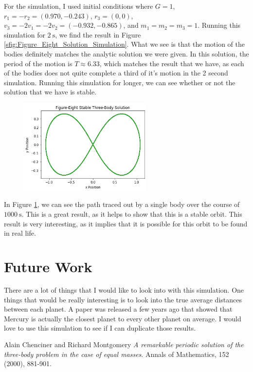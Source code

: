 \documentclass{article}
\renewcommand{\l}{\left}
\renewcommand{\r}{\right}
\begin{document}
For the simulation, I used initial conditions where $G = 1$, $r_1 = -r_2 = \l( 0.970 , -0.243 \r)$, $r_3 = (0,0)$, $v_3 = -2v_1 = -2v_2 = \l(-0.932, -0.865\r)$, and $m_1 = m_2 = m_3 = 1$. Running this simulation for $\SI{2}{\second}$, we find the result in Figure \ref{sfig:Figure_Eight_Solution_Simulation}. What we see is that the motion of the bodies definitely matches the analytic solution we were given. In this solution, the period of the motion is $T \approx 6.33$, which matches the result that we have, as each of the bodies does not quite complete a third of it's motion in the 2 second simulation. Running this simulation for longer, we can see whether or not the solution that we have is stable. \medskip

\begin{figure}[ht]
	\centering
	\includegraphics[width = 0.6\textwidth]{Figure_Eight_Solution_Long_Term.png}
	\caption{}
	\label{fig:Figure_Eight_Solution_Long_Term}
\end{figure}

In Figure \ref{fig:Figure_Eight_Solution_Long_Term}, we can see the path traced out by a single body over the course of $\SI{1000}{\second}$. This is a great result, as it helps to show that this is a stable orbit. This result is very interesting, as it implies that it is possible for this orbit to be found in real life. 

\section*{Future Work}
There are a lot of things that I would like to look into with this simulation. One things that would be really interesting is to look into the true average distances between each planet. A paper was released a few years ago that showed that Mercury is actually the closest planet to every other planet on average. I would love to use this simulation to see if I can duplicate those results.

\begin{thebibliography}{9}
Alain Chenciner and Richard Montgomery
\textit{A remarkable periodic solution of the three-body problem in the case of equal masses}. 
Annals of Mathematics, 152 (2000), 881-901.
\end{thebibliography}
\end{document}
